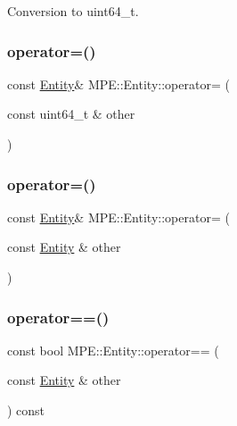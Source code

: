 Conversion to uint64\+\_\+t. 

\mbox{\label{struct_m_p_e_1_1_entity_aa48771c026e87c391bff9e75d179b538}} 
\subsubsection{\texorpdfstring{operator=()}{operator=()}\hspace{0.1cm}{\footnotesize\ttfamily [1/2]}}
{\footnotesize\ttfamily const \hyperlink{struct_m_p_e_1_1_entity}{Entity}\& M\+P\+E\+::\+Entity\+::operator= (\begin{DoxyParamCaption}\item[{const uint64\+\_\+t \&}]{other }\end{DoxyParamCaption})\hspace{0.3cm}{\ttfamily [inline]}}

\mbox{\label{struct_m_p_e_1_1_entity_ad356d6b8c3df7cbd8dcc24dd1a3d718d}} 
\subsubsection{\texorpdfstring{operator=()}{operator=()}\hspace{0.1cm}{\footnotesize\ttfamily [2/2]}}
{\footnotesize\ttfamily const \hyperlink{struct_m_p_e_1_1_entity}{Entity}\& M\+P\+E\+::\+Entity\+::operator= (\begin{DoxyParamCaption}\item[{const \hyperlink{struct_m_p_e_1_1_entity}{Entity} \&}]{other }\end{DoxyParamCaption})\hspace{0.3cm}{\ttfamily [inline]}}

\mbox{\label{struct_m_p_e_1_1_entity_a587d74654df3a9be46403264c9bb016a}} 
\subsubsection{\texorpdfstring{operator==()}{operator==()}}
{\footnotesize\ttfamily const bool M\+P\+E\+::\+Entity\+::operator== (\begin{DoxyParamCaption}\item[{const \hyperlink{struct_m_p_e_1_1_entity}{Entity} \&}]{other }\end{DoxyParamCaption}) const\hspace{0.3cm}{\ttfamily [inline]}}



